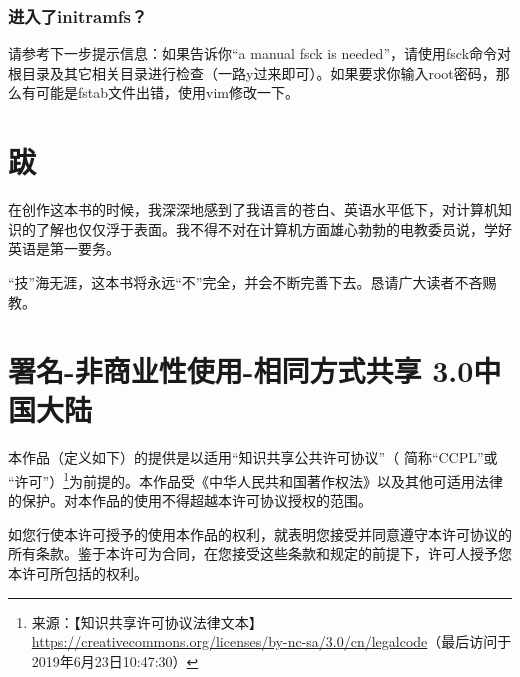 \documentclass{book}
\renewcommand{\thechapter}{\arabic{chapter}}
\begin{document}
\subsection{进入了initramfs？}
请参考下一步提示信息：如果告诉你“a manual fsck is needed”，请使用fsck命令对根目录及其它相关目录进行检查（一路y过来即可）。如果要求你输入root密码，那么有可能是fstab文件出错，使用vim修改一下。
\appendix
\renewcommand{\thechapter}{\Roman{chapter}}
\chapter{跋}
在创作这本书的时候，我深深地感到了我语言的苍白、英语水平低下，对计算机知识的了解也仅仅浮于表面。我不得不对在计算机方面雄心勃勃的电教委员说，学好英语是第一要务。\par
“技”海无涯，这本书将永远“不”完全，并会不断完善下去。恳请广大读者不吝赐教。
\chapter{署名-非商业性使用-相同方式共享 3.0中国大陆}
本作品（定义如下）的提供是以适用“知识共享公共许可协议”（ 简称“CCPL”或 “许可”）\footnote{来源：【知识共享许可协议法律文本】\url{https://creativecommons.org/licenses/by-nc-sa/3.0/cn/legalcode}（最后访问于2019年6月23日10:47:30）}为前提的。本作品受《中华人民共和国著作权法》以及其他可适用法律的保护。对本作品的使用不得超越本许可协议授权的范围。\par
如您行使本许可授予的使用本作品的权利，就表明您接受并同意遵守本许可协议的所有条款。鉴于本许可为合同，在您接受这些条款和规定的前提下，许可人授予您本许可所包括的权利。
\end{document}
